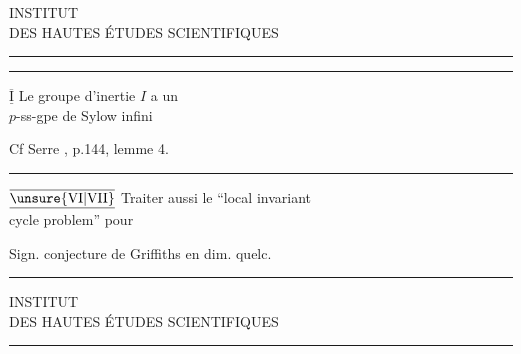 \begin{center}
INSTITUT\\
DES HAUTES ÉTUDES SCIENTIFIQUES\\[-.3ex]
\rule{1.3cm}{.4pt}
\end{center}


\noindent\rule{.62\linewidth}{.4pt}

$\underline{\overline{\mathrm{I}}}$ \quad Le groupe d'inertie $I$ a un\\
\hspace*{2em}$p$-ss-gpe de Sylow infini

Cf Serre  , p.144, lemme 4.

\noindent\rule{.88\linewidth}{.4pt}

$\underline{\overline{\unsure{\mathrm{VI}|\mathrm{VII}}}}$ \quad Traiter aussi le ``local invariant\\
\hspace*{2em}cycle problem'' pour 

Sign.  conjecture de Griffiths en dim. quelc.

\noindent\rule{.96\linewidth}{.4pt}

\begin{center}
INSTITUT\\
DES HAUTES ÉTUDES SCIENTIFIQUES\\[-.3ex]
\rule{1.3cm}{.4pt}
\end{center}

